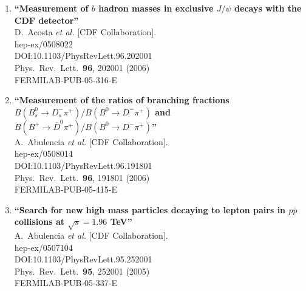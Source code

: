 \documentclass{article}
\begin{document}
\begin{enumerate}
{\bf ``Measurements of inclusive W and Z cross sections in p anti-p collisions at s**(1/2) = 1.96-TeV''}
  \\{}A.~Abulencia {\it et al.} [CDF Collaboration].
  \\{}hep-ex/0508029
  \\{}DOI:10.1088/0954-3899/34/12/001
  \\{}J.\ Phys.\ G {\bf 34}, 2457 (2007)
  \\{}FERMILAB-PUB-05-360-E
\item%
{\bf ``Measurement of $b$ hadron masses in exclusive $J/\psi$ decays with the CDF detector''}
  \\{}D.~Acosta {\it et al.} [CDF Collaboration].
  \\{}hep-ex/0508022
  \\{}DOI:10.1103/PhysRevLett.96.202001
  \\{}Phys.\ Rev.\ Lett.\  {\bf 96}, 202001 (2006)
  \\{}FERMILAB-PUB-05-316-E
\item%
{\bf ``Measurement of the ratios of branching fractions $B(B_s^0 \to D_s^- \pi^+)/B(B^0 \to D^- \pi^+)$ and $B(B^+ \to \overline{D}^0 \pi^+)/B(B^0 \to D^- \pi^+)$''}
  \\{}A.~Abulencia {\it et al.} [CDF Collaboration].
  \\{}hep-ex/0508014
  \\{}DOI:10.1103/PhysRevLett.96.191801
  \\{}Phys.\ Rev.\ Lett.\  {\bf 96}, 191801 (2006)
  \\{}FERMILAB-PUB-05-415-E
\item%
{\bf ``Search for new high mass particles decaying to lepton pairs in $p\bar{p}$ collisions at $\sqrt{s} = 1.96$ TeV''}
  \\{}A.~Abulencia {\it et al.} [CDF Collaboration].
  \\{}hep-ex/0507104
  \\{}DOI:10.1103/PhysRevLett.95.252001
  \\{}Phys.\ Rev.\ Lett.\  {\bf 95}, 252001 (2005)
  \\{}FERMILAB-PUB-05-337-E

\end{enumerate}
\end{document}
